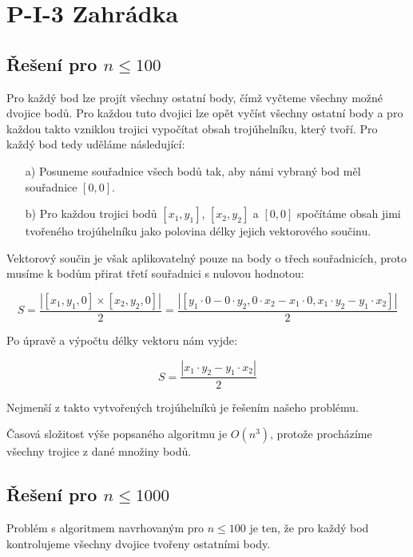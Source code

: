 \documentclass[a4paper, 12pt]{article}
\begin{document}
  \section{P-I-3 Zahrádka}

  \subsection{Řešení pro $n\le100$}
  Pro každý bod lze projít všechny ostatní body, čímž vyčteme všechny možné dvojice bodů. Pro každou tuto dvojici lze opět vyčíst všechny ostatní body a pro každou takto vzniklou trojici vypočítat obsah trojúhelníku, který tvoří. Pro každý bod tedy uděláme následující:
  \begin{itemize}
    \item[a)] Posuneme souřadnice všech bodů tak, aby námi vybraný bod měl souřadnice $[0,0]$.
    \item[b)] Pro každou trojici bodů $[x_1,y_1]$, $[x_2,y_2]$ a $[0,0]$ spočítáme obsah jimi tvořeného trojúhelníku jako polovina délky jejich vektorového součinu.
  \end{itemize}

  Vektorový součin je však aplikovatelný pouze na body o třech souřadnicích, proto musíme k bodům přirat třetí souřadnici s nulovou hodnotou:

  \begin{equation*}
    S=\frac{| [x_1,y_1,0]\times[x_2,y_2,0] |}{2}
    =\frac{| [y_1 \cdot 0 - 0 \cdot y_2, 0 \cdot x_2 - x_1 \cdot 0, x_1 \cdot y_2 - y_1 \cdot x_2] |}{2}
  \end{equation*}

  Po úpravě a výpočtu délky vektoru nám vyjde:

  \begin{equation*}
    S=\frac{| x_1 \cdot y_2 - y_1 \cdot x_2 |}{2}
  \end{equation*}

  Nejmenší z takto vytvořených trojúhelníků je řešením našeho problému.

  Časová složitost výše popsaného algoritmu je $O(n^3)$, protože procházíme všechny trojice z dané množiny bodů.

  \subsection{Řešení pro $n\le1000$}
  Problém s algoritmem navrhovaným pro $n\le100$ je ten, že pro každý bod kontrolujeme všechny dvojice tvořeny ostatními body.
\end{document}
